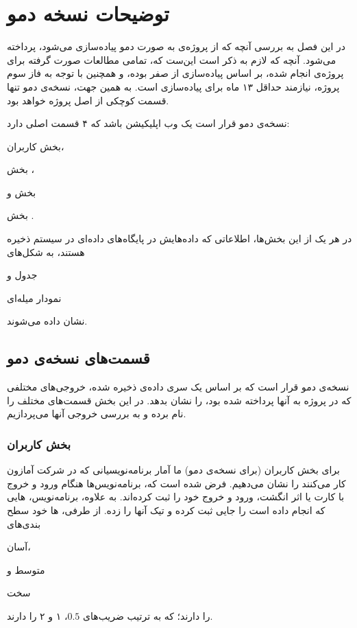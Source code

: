 \documentclass[11pt, oneside]{book}
\begin{document}
\frontmatter

\tableofcontents
\mainmatter

\chapter{توضیحات نسخه دمو}
در این فصل به بررسی آنچه که از پروژه‌ی 
به صورت دمو پیاده‌سازی می‌شود، پرداخته می‌شود. آنچه که لازم به ذکر است این‌ست که، تمامی مطالعات صورت گرفته برای پروژه‌ی
انجام شده، بر اساس پیاده‌سازی از صفر بوده، و همچنین با توجه به فاز سوم پروژه، نیازمند حداقل ۱۳ ماه برای پیاده‌سازی است. به همین جهت، نسخه‌ی دمو تنها قسمت کوچکی از اصل پروژه خواهد بود.

نسخه‌ی دمو قرار است یک وب اپلیکیشن باشد که ۴ قسمت اصلی دارد: 
\begin{enumerate*}
\item 
بخش کاربران،
\item 
بخش 
،
\item 
بخش 
و
\item
بخش 
. 
\end{enumerate*}
در هر یک از این بخش‌ها، اطلاعاتی که داده‌هایش در پایگاه‌های داده‌ای در سیستم ذخیره‌ هستند، به شکل‌های 
\begin{enumerate*}
\item 
جدول و
\item 
نمودار میله‌ای
\end{enumerate*}
نشان داده می‌شوند.
\section{قسمت‌های نسخه‌ی دمو}
نسخه‌ی دمو قرار است که بر اساس یک سری داده‌ی ذخیره شده، خروجی‌های مختلفی که در پروژه به آنها پرداخته شده بود، را نشان بدهد. در این بخش قسمت‌های مختلف را نام برده و به بررسی خروجی آنها می‌پردازیم.

\subsection{بخش کاربران}\label{ssec:users}
برای بخش کاربران (برای نسخه‌ی دمو) ما آمار برنامه‌نویسیانی که در شرکت آمازون کار می‌کنند را نشان می‌دهیم. فرض شده‌ است که، برنامه‌نویس‌ها هنگام ورود و خروج با کارت یا اثر انگشت، ورود و خروج خود را ثبت کرده‌اند. به علاوه، برنامه‌نویس، هایی که انجام داده‌ است را جایی ثبت کرده و تیک آنها را زده. از طرفی، ها خود سطح بندی‌های 
\begin{enumerate*}
\item 
آسان،
\item 
متوسط و
\item
سخت
\end{enumerate*}
را دارند؛ که به ترتیب ضریب‌‌های $0.5$، ۱ و ۲ را دارند.
\end{document}
